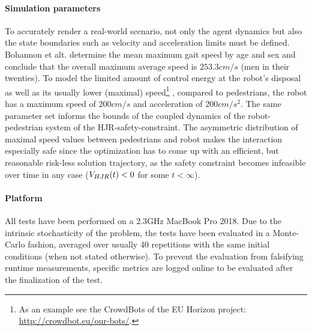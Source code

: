 \paragraph{Simulation parameters}
To accurately render a real-world scenario, not only the agent dynamics but also the state boundaries such as velocity and acceleration limits must be defined. Bohannon et alt. \cite{Bohannon1997} determine the mean maximum gait speed by age and sex and conclude that the overall maximum average speed is $253.3 cm/s$ (men in their twenties). To model the limited amount of control energy at the robot's disposal as well as its usually lower (maximal) speed\footnote{As an example see the CrowdBots of the EU Horizon project: \href{http://crowdbot.eu/our-bots/}{http://crowdbot.eu/our-bots/}.} , compared to pedestrians, the robot has a maximum speed of $200 cm/s$ and acceleration of $200 cm/s^2$. The same parameter set informs the bounds of the coupled dynamics of the robot-pedestrian system of the \ac{HJR}-safety-constraint. The asymmetric distribution of maximal speed values between pedestrians and robot makes the interaction especially safe since the optimization has to come up with an efficient, but reasonable risk-less solution trajectory, as the safety constraint becomes infeasible over time in any case ($V_{HJR}(t) < 0$ for some $t < \infty$).

\paragraph{Platform} 
All tests have been performed on a 2.3GHz MacBook Pro 2018. Due to the intrinsic stochasticity of the problem, the tests have been evaluated in a Monte-Carlo fashion, averaged over usually 40 repetitions with the same initial conditions (when not stated otherwise). To prevent the evaluation from falsifying runtime measurements, specific metrics are logged online to be evaluated after the finalization of the test.
